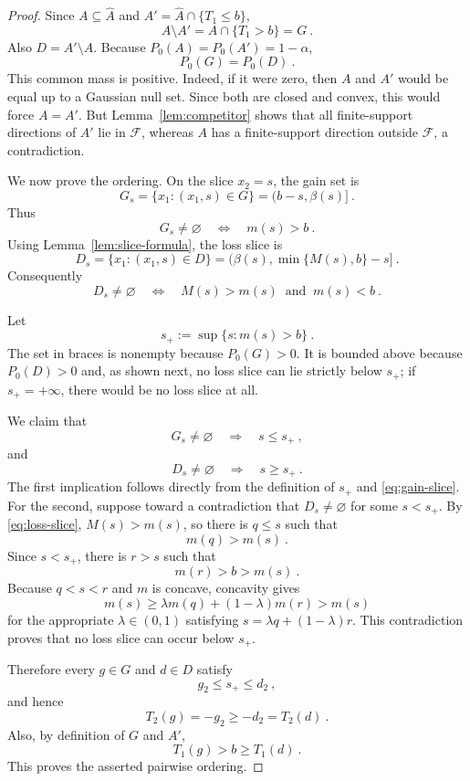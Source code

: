\documentclass[12pt]{article}
\theoremstyle{remark}
\begin{document}
\begin{proof}
Since $A\subseteq\widehat A$ and $A'=\widehat A\cap\{T_1\le b\}$,
\[
A\setminus A'=A\cap\{T_1>b\}=G~.
\]
Also $D=A'\setminus A$.  Because $P_0(A)=P_0(A')=1-\alpha$,
\[
P_0(G)=P_0(D)~.
\]
This common mass is positive.  Indeed, if it were zero, then $A$ and $A'$ would be equal up to a Gaussian null set.  Since both are closed and convex, this would force $A=A'$.  But Lemma~\ref{lem:competitor} shows that all finite-support directions of $A'$ lie in $\mathcal F$, whereas $A$ has a finite-support direction outside $\mathcal F$, a contradiction.

We now prove the ordering.  On the slice $x_2=s$, the gain set is
\[
G_s
=
\{x_1:(x_1,s)\in G\}
=
(b-s,\beta(s)]~.
\]
Thus
\begin{equation}\label{eq:gain-slice}
G_s\ne\varnothing
\quad\Longleftrightarrow\quad
m(s)>b~.
\end{equation}
Using Lemma~\ref{lem:slice-formula}, the loss slice is
\[
D_s
=
\{x_1:(x_1,s)\in D\}
=
(\beta(s),\min\{M(s),b\}-s]~.
\]
Consequently
\begin{equation}\label{eq:loss-slice}
D_s\ne\varnothing
\quad\Longleftrightarrow\quad
M(s)>m(s)\ \text{ and }\ m(s)<b~.
\end{equation}

Let
\[
s_+:=\sup\{s:m(s)>b\}~.
\]
The set in braces is nonempty because $P_0(G)>0$.  It is bounded above because $P_0(D)>0$ and, as shown next, no loss slice can lie strictly below $s_+$; if $s_+=+\infty$, there would be no loss slice at all.

We claim that
\[
G_s\ne\varnothing\quad\Longrightarrow\quad s\le s_+~,
\]
and
\[
D_s\ne\varnothing\quad\Longrightarrow\quad s\ge s_+~.
\]
The first implication follows directly from the definition of $s_+$ and \eqref{eq:gain-slice}.  For the second, suppose toward a contradiction that $D_s\ne\varnothing$ for some $s<s_+$.  By \eqref{eq:loss-slice}, $M(s)>m(s)$, so there is $q\le s$ such that
\[
m(q)>m(s)~.
\]
Since $s<s_+$, there is $r>s$ such that
\[
m(r)>b>m(s)~.
\]
Because $q<s<r$ and $m$ is concave, concavity gives
\[
m(s)
\ge
\lambda m(q)+(1-\lambda)m(r)
>
m(s)
\]
for the appropriate $\lambda\in(0,1)$ satisfying $s=\lambda q+(1-\lambda)r$.  This contradiction proves that no loss slice can occur below $s_+$.

Therefore every $g\in G$ and $d\in D$ satisfy
\[
g_2\le s_+\le d_2~,
\]
and hence
\[
T_2(g)=-g_2\ge -d_2=T_2(d)~.
\]
Also, by definition of $G$ and $A'$,
\[
T_1(g)>b\ge T_1(d)~.
\]
This proves the asserted pairwise ordering.
\end{proof}
\end{document}
